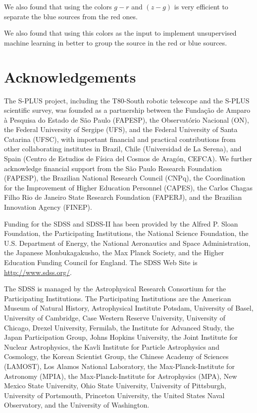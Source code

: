 \documentclass[fleqn,usenatbib]{mnras}
\begin{document}
{We also found that using the colors $g - r$ and $(z - g)$ is very efficient to separate
the blue sources from the red ones.

We also found that using this colors as the input to implement unsupervised machine learning
in better to group the source in the red or blue sources.

\section*{Acknowledgements}

The S-PLUS project, including the T80-South robotic telescope and
the S-PLUS scientific survey, was founded as a partnership between the
Fundação de Amparo à Pesquisa do Estado de S\~{a}o Paulo
(FAPESP), the Observatório Nacional (ON), the Federal University of
Sergipe (UFS), and the Federal University of Santa Catarina
(UFSC), with important financial and practical contributions from
other collaborating institutes in Brazil, Chile (Universidad de La
Serena), and Spain (Centro de Estudios de Física del Cosmos de
Aragón, CEFCA). We further acknowledge financial support from
the São Paulo Research Foundation (FAPESP), the Brazilian National
Research Council (CNPq), the Coordination for the Improvement of
Higher Education Personnel (CAPES), the Carlos Chagas Filho Rio
de Janeiro State Research Foundation (FAPERJ), and the Brazilian
Innovation Agency (FINEP).

Funding for the SDSS and SDSS-II has been provided by the Alfred P.
Sloan Foundation, the Participating Institutions, the National Science
Foundation, the U.S. Department of Energy, the National Aeronautics
and Space Administration, the Japanese Monbukagakusho, the Max
Planck Society, and the Higher Education Funding Council for England.
The SDSS Web Site is \url{http://www.sdss.org/}.

The SDSS is managed by the Astrophysical Research Consortium for
the Participating Institutions. The Participating Institutions
are the American Museum of Natural History, Astrophysical Institute Potsdam,
University of Basel, University of Cambridge, Case Western Reserve University,
University of Chicago, Drexel University, Fermilab, the Institute for Advanced
Study, the Japan Participation Group, Johns Hopkins University, the Joint
Institute for Nuclear Astrophysics, the Kavli Institute for Particle Astrophysics
and Cosmology, the Korean Scientist Group, the Chinese Academy of Sciences (LAMOST),
Los Alamos National Laboratory, the Max-Planck-Institute for Astronomy (MPIA),
the Max-Planck-Institute for Astrophysics (MPA), New Mexico State University,
Ohio State University, University of Pittsburgh, University of Portsmouth,
Princeton University, the United States Naval Observatory, and the University
of Washington.

}
\end{document}
